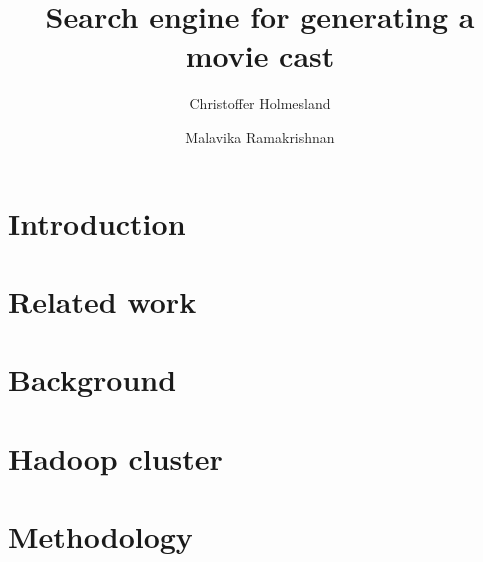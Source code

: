 \documentclass[sigconf]{acmart}
\begin{document}
\sloppy
\title{Search engine for generating a movie cast}

\author{Christoffer Holmesland}

\author{Malavika Ramakrishnan}




\begin{abstract}

\end{abstract}


\maketitle


\section{Introduction}
\label{sec:introduction}


\section{Related work}
\label{sec:relatedwork}


\section{Background}
\label{sec:background}


\section{Hadoop cluster}
\label{sec:hadoop}


\section{Methodology}
\label{sec:method}

\end{document}
